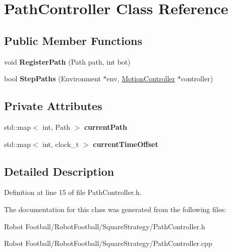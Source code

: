 \hypertarget{class_path_controller}{\section{Path\-Controller Class Reference}
\label{class_path_controller}
}
\subsection*{Public Member Functions}
\begin{DoxyCompactItemize}
\item 
\hypertarget{class_path_controller_acf7268f9177d303d85d56d87b703e79c}{void {\bfseries Register\-Path} (Path path, int bot)}\label{class_path_controller_acf7268f9177d303d85d56d87b703e79c}

\item 
\hypertarget{class_path_controller_a14dbd06c640996372d7d9e6542750979}{bool {\bfseries Step\-Paths} (Environment $\ast$env, \hyperlink{class_motion_controller}{Motion\-Controller} $\ast$controller)}\label{class_path_controller_a14dbd06c640996372d7d9e6542750979}

\end{DoxyCompactItemize}
\subsection*{Private Attributes}
\begin{DoxyCompactItemize}
\item 
\hypertarget{class_path_controller_a969ca4134486fc3c5db7afd3f20afb27}{std\-::map$<$ int, Path $>$ {\bfseries current\-Path}}\label{class_path_controller_a969ca4134486fc3c5db7afd3f20afb27}

\item 
\hypertarget{class_path_controller_a1c96dff1002984fb7e78c11b441c1926}{std\-::map$<$ int, clock\-\_\-t $>$ {\bfseries current\-Time\-Offset}}\label{class_path_controller_a1c96dff1002984fb7e78c11b441c1926}

\end{DoxyCompactItemize}


\subsection{Detailed Description}


Definition at line 15 of file Path\-Controller.\-h.



The documentation for this class was generated from the following files\-:\begin{DoxyCompactItemize}
\item 
Robot Football/\-Robot\-Football/\-Square\-Strategy/Path\-Controller.\-h\item 
Robot Football/\-Robot\-Football/\-Square\-Strategy/Path\-Controller.\-cpp\end{DoxyCompactItemize}
